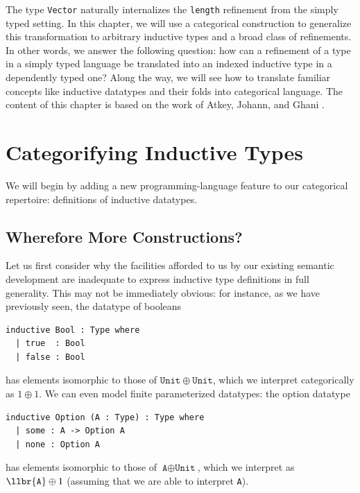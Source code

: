 The type \texttt{Vector} naturally internalizes the \texttt{length} refinement from the simply typed
setting. In this chapter, we will use a categorical construction to generalize this transformation
to arbitrary inductive types and a broad class of refinements. In other words, we answer the
following question: how can a refinement of a type in a simply typed language be translated into an
indexed inductive type in a dependently typed one? Along the way, we will see how to translate
familiar concepts like inductive datatypes and their folds into categorical language. The content of
this chapter is based on the work of Atkey, Johann, and Ghani \citep{atkey2011refining}.


\section{Categorifying Inductive Types}

We will begin by adding a new programming-language feature to our categorical repertoire:
definitions of inductive datatypes.

\subsection{Wherefore More Constructions?}

Let us first consider why the facilities afforded to us by our existing semantic development are
inadequate to express inductive type definitions in full generality. This may not be immediately
obvious: for instance, as we have previously seen, the datatype of booleans
\begin{lstlisting}
inductive Bool : Type where
  | true  : Bool
  | false : Bool
\end{lstlisting}
has elements isomorphic to those of $\mathtt{Unit} \oplus \mathtt{Unit}$, which we interpret
categorically as $1 \oplus 1$. We can even model finite parameterized datatypes: the option datatype
\begin{lstlisting}
inductive Option (A : Type) : Type where
  | some : A -> Option A
  | none : Option A
\end{lstlisting}
has elements isomorphic to those of $\texttt{A} \oplus \texttt{Unit}$, which we interpret as
$\llbr{\texttt{A}} \oplus 1$ (assuming that we are able to interpret \texttt{A}).

